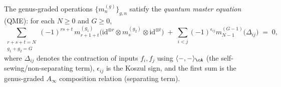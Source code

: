 \begin{theorem}\label{thm:quantum-master-equation}
The genus-graded operations $\{m_n^{(g)}\}_{g,n}$ satisfy the
\emph{quantum master equation} (QME): for each $N \geq 0$ and
$G \geq 0$,
\begin{equation}\label{eq:QME}
\sum_{\substack{r + s + t = N \\ g_1 + g_2 = G}}
(-1)^{rs+t}\,
m_{r+1+t}^{(g_1)}\!\bigl(\mathrm{id}^{\otimes r}
\otimes m_s^{(g_2)} \otimes \mathrm{id}^{\otimes t}\bigr)
\;+\;
\sum_{i < j}
(-1)^{\epsilon_{ij}}
m_{N-1}^{(G-1)}\bigl(\Delta_{ij}\bigr)
\;=\; 0,
\end{equation}
where $\Delta_{ij}$ denotes the contraction of inputs $f_i, f_j$
using $\langle -, - \rangle_\cA$ (the self-sewing/non-separating
term), $\epsilon_{ij}$ is the Koszul sign, and the first sum is
the genus-graded $A_\infty$ composition relation (separating term).
\end{theorem}

